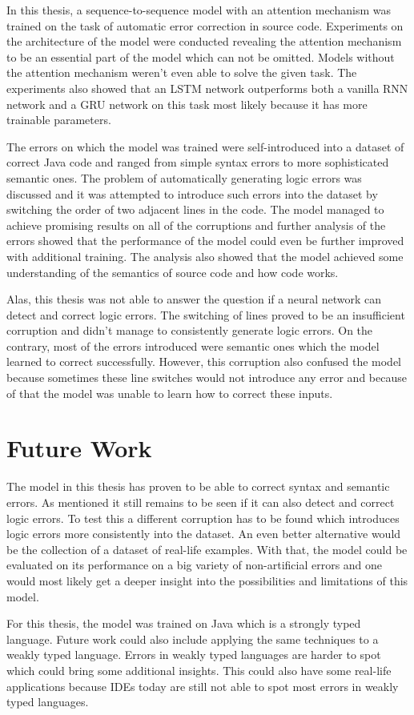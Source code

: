 In this thesis, a sequence-to-sequence model with an attention mechanism was trained on the task of automatic error correction in source code. Experiments on the architecture of the model were conducted revealing the attention mechanism to be an essential part of the model which can not be omitted. Models without the attention mechanism weren't even able to solve the given task. The experiments also showed that an LSTM network outperforms both a vanilla RNN network and a GRU network on this task most likely because it has more trainable parameters.

The errors on which the model was trained were self-introduced into a dataset of correct Java code and ranged from simple syntax errors to more sophisticated semantic ones. The problem of automatically generating logic errors was discussed and it was attempted to introduce such errors into the dataset by switching the order of two adjacent lines in the code. The model managed to achieve promising results on all of the corruptions and further analysis of the errors showed that the performance of the model could even be further improved with additional training. The analysis also showed that the model achieved some understanding of the semantics of source code and how code works.

Alas, this thesis was not able to answer the question if a neural network can detect and correct logic errors. The switching of lines proved to be an insufficient corruption and didn't manage to consistently generate logic errors. On the contrary, most of the errors introduced were semantic ones which the model learned to correct successfully. However, this corruption also confused the model because sometimes these line switches would not introduce any error and because of that the model was unable to learn how to correct these inputs.

\section{Future Work}

The model in this thesis has proven to be able to correct syntax and semantic errors. As mentioned it still remains to be seen if it can also detect and correct logic errors. To test this a different corruption has to be found which introduces logic errors more consistently into the dataset. An even better alternative would be the collection of a dataset of real-life examples. With that, the model could be evaluated on its performance on a big variety of non-artificial errors and one would most likely get a deeper insight into the possibilities and limitations of this model.

For this thesis, the model was trained on Java which is a strongly typed language. Future work could also include applying the same techniques to a weakly typed language. Errors in weakly typed languages are harder to spot which could bring some additional insights. This could also have some real-life applications because IDEs today are still not able to spot most errors in weakly typed languages.
